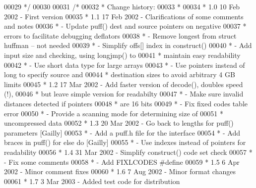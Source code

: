 \begin{DoxyCode}
00029 \textcolor{comment}{ */}
00030 
00031 \textcolor{comment}{/*}
00032 \textcolor{comment}{ * Change history:}
00033 \textcolor{comment}{ *}
00034 \textcolor{comment}{ * 1.0  10 Feb 2002     - First version}
00035 \textcolor{comment}{ * 1.1  17 Feb 2002     - Clarifications of some comments and notes}
00036 \textcolor{comment}{ *                      - Update puff() dest and source pointers on negative}
00037 \textcolor{comment}{ *                        errors to facilitate debugging deflators}
00038 \textcolor{comment}{ *                      - Remove longest from struct huffman -- not needed}
00039 \textcolor{comment}{ *                      - Simplify offs[] index in construct()}
00040 \textcolor{comment}{ *                      - Add input size and checking, using longjmp() to}
00041 \textcolor{comment}{ *                        maintain easy readability}
00042 \textcolor{comment}{ *                      - Use short data type for large arrays}
00043 \textcolor{comment}{ *                      - Use pointers instead of long to specify source and}
00044 \textcolor{comment}{ *                        destination sizes to avoid arbitrary 4 GB limits}
00045 \textcolor{comment}{ * 1.2  17 Mar 2002     - Add faster version of decode(), doubles speed (!),}
00046 \textcolor{comment}{ *                        but leave simple version for readabilty}
00047 \textcolor{comment}{ *                      - Make sure invalid distances detected if pointers}
00048 \textcolor{comment}{ *                        are 16 bits}
00049 \textcolor{comment}{ *                      - Fix fixed codes table error}
00050 \textcolor{comment}{ *                      - Provide a scanning mode for determining size of}
00051 \textcolor{comment}{ *                        uncompressed data}
00052 \textcolor{comment}{ * 1.3  20 Mar 2002     - Go back to lengths for puff() parameters [Gailly]}
00053 \textcolor{comment}{ *                      - Add a puff.h file for the interface}
00054 \textcolor{comment}{ *                      - Add braces in puff() for else do [Gailly]}
00055 \textcolor{comment}{ *                      - Use indexes instead of pointers for readability}
00056 \textcolor{comment}{ * 1.4  31 Mar 2002     - Simplify construct() code set check}
00057 \textcolor{comment}{ *                      - Fix some comments}
00058 \textcolor{comment}{ *                      - Add FIXLCODES #define}
00059 \textcolor{comment}{ * 1.5   6 Apr 2002     - Minor comment fixes}
00060 \textcolor{comment}{ * 1.6   7 Aug 2002     - Minor format changes}
00061 \textcolor{comment}{ * 1.7   3 Mar 2003     - Added test code for distribution}

\end{DoxyCode}
